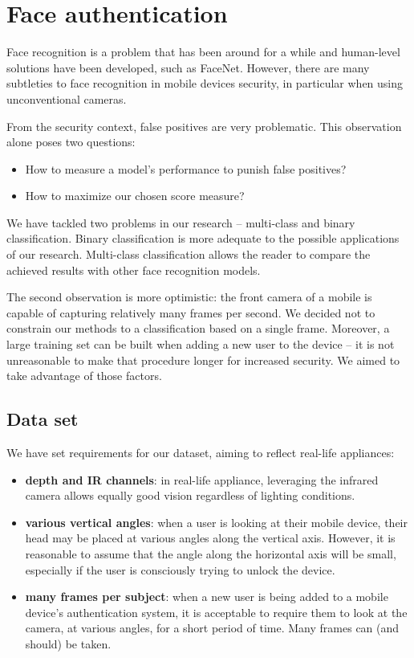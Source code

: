 \chapter{Face authentication}
    Face recognition is a problem that has been around for a while and
    human-level solutions have been developed, such as FaceNet\cite{arXiv:1503.03832}.
    However, there are many subtleties to face recognition in mobile devices
    security, in particular when using unconventional cameras.

    From the security context, false positives are very problematic. This observation alone
    poses two questions:
    \begin{itemize}
      \item How to measure a model's performance to punish false positives?
      \item How to maximize our chosen score measure?
    \end{itemize}
    We have tackled two problems in our research -- multi-class and binary classification.
    Binary classification is more adequate to the possible applications of our research.
    Multi-class classification allows the reader to compare the achieved results
    with other face recognition models.

    The second observation is more optimistic: the front camera of a mobile is capable of
    capturing relatively many frames per second. We decided not to constrain our
    methods to a classification based on a single frame.
    Moreover, a large training set can be built
    when adding a new user to the device -- it is not unreasonable to make that procedure
    longer for increased security. We aimed to take advantage of those factors.

    \section{Data set}
    We have set requirements for our dataset, aiming to reflect real-life
    appliances:
    \begin{itemize}
        \item \textbf{depth and IR channels}: in real-life appliance, leveraging
        the infrared camera allows equally good vision regardless of lighting
        conditions.
        \item \textbf{various vertical angles}: when a user is looking at their
        mobile device,
        their head may be placed at various angles along the vertical axis.
        However, it is reasonable to assume that the angle along the horizontal
        axis will be small, especially if the user is consciously trying to
        unlock the device.
        \item \textbf{many frames per subject}: when a new user is being added
        to a mobile device's authentication system, it is acceptable to require
        them to look at the camera, at various angles, for a short period of
        time. Many frames can (and should) be taken.
    \end{itemize}


